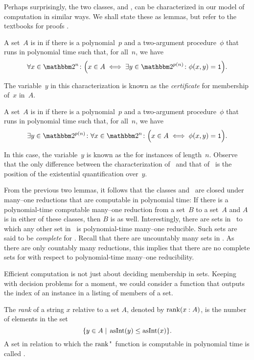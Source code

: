 Perhaps surprisingly, the two classes,  and , can be characterized in our model of computation in similar ways.
We shall state these as lemmas, but refer to the textbooks for proofs \parencites(for~:)()[Section~2.1]{arora2009computational}[and][Section~2.1.5]{goldreich2008computational} \parencites(for~:)()[Section~6.3]{arora2009computational}[and][Section~3.1]{goldreich2008computational}.
\begin{lemma}
  A set~$A$ is in  if there is a polynomial~$p$ and a two-argument procedure~$\phi$ that runs in polynomial time such that, for all~$n$, we have
  \begin{equation*}
    \forall x \in \binary^n\colon \Big(x \in A \iff \exists y \in \binary^{p(n)}\colon \phi(x, y) = \bits{1}\Big).
  \end{equation*}
\end{lemma}
The variable~$y$ in this characterization is known as the \emph{certificate} for membership of~$x$ in~$A$.
\begin{lemma}
  A set~$A$ is in  if there is a polynomial~$p$ and a two-argument procedure~$\phi$ that runs in polynomial time such that, for all~$n$, we have
  \begin{equation*}
    \exists y \in \binary^{p(n)}\colon \forall x \in \binary^n\colon \Big(x \in A \iff \phi(x, y) = \bits{1}\Big).
  \end{equation*}
\end{lemma}
In this case, the variable~$y$ is known as the  for instances of length~$n$.
Observe that the only difference between the characterization of~ and that of~ is the position of the existential quantification over~$y$.

From the previous two lemmas, it follows that the classes  and~ are closed under many--one reductions that are computable in polynomial time:
If there is a polynomial-time computable many--one reduction from a set~$B$ to a set~$A$ and $A$ is in either of these classes, then $B$ is as well.
Interestingly, there are sets in~ to which any other set in~ is polynomial-time many--one reducible.
Such sets are said to be \emph{complete} for .
Recall that there are uncountably many sets in .
As there are only countably many reductions, this implies that there are no complete sets for  with respect to polynomial-time many--one reducibility.

Efficient computation is not just about deciding membership in sets.
Keeping with decision problems for a moment, we could consider a function that outputs the index of an instance in a listing of members of a set.
\begin{definition}
  The \emph{rank} of a string $x$ relative to a set $A$, denoted by $\operatorname{rank}(x : A)$, is the number of elements in the set
  \begin{equation*}
    \{y \in A \;|\; \operatorname{asInt}(y) \le \operatorname{asInt}(x)\}.
  \end{equation*}
  A set in relation to which the $\operatorname{rank}$"~function is computable in polynomial time is called .
\end{definition}

